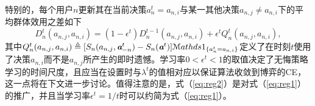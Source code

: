 特别的，每个用户$n$更新其在当前决策$a^t_n=a_{n,i}$与某一其他决策$a_{n,j}\neq a_{n,i}$下的平均群体效用之差如下
\begin{equation}\label{eq:reg2}
D^t_n(a_{n,j},a_{n,i})=(1-\epsilon^t)D^{t-1}_n(a_{n,j},a_{n,i})+\epsilon^tQ^t_n(a_{n,j},a_{n,i}),
\end{equation}
其中$Q^t_n(a_{n,j},a_{n,i})\triangleq[S_n(a_{n,j},\emph{\textbf{a}}^t_{-n})-S_n(\emph{\textbf{a}}^t)]\mathcal{M}athds{1}_{\{a^t_n=a_{n,i}\}}$定义了在时刻$t$使用了决策$a_{n,i}$而不是$a_{n,j}$所产生的即时遗憾。学习率$0<\epsilon^t<1$的取值决定了无悔策略学习的时间尺度，且应当在设置时与$\lambda^t$的值相对应以保证算法收敛到博弈的CE，这一点将在下文进一步讨论。值得注意的是，式（\ref{eq:reg2}）是对式（\ref{eq:reg1}）的推广，并且当学习率$\epsilon^t=1/t$时可以约简为式（\ref{eq:reg1}）。

